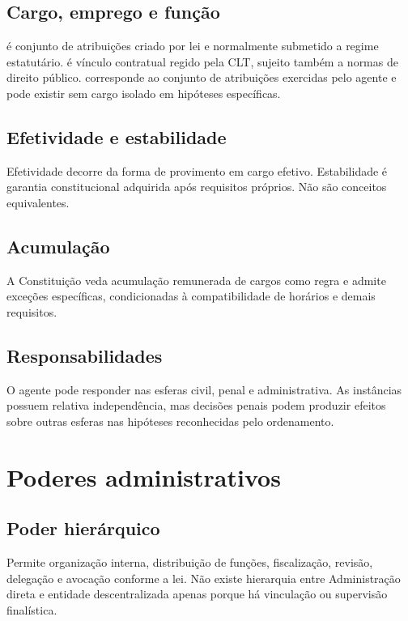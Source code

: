 \subsection{Cargo, emprego e função}

 é conjunto de atribuições criado por lei e normalmente submetido a regime estatutário.  é vínculo contratual regido pela CLT, sujeito também a normas de direito público.  corresponde ao conjunto de atribuições exercidas pelo agente e pode existir sem cargo isolado em hipóteses específicas.

\subsection{Efetividade e estabilidade}

Efetividade decorre da forma de provimento em cargo efetivo. Estabilidade é garantia constitucional adquirida após requisitos próprios. Não são conceitos equivalentes.

\subsection{Acumulação}

A Constituição veda acumulação remunerada de cargos como regra e admite exceções específicas, condicionadas à compatibilidade de horários e demais requisitos.

\subsection{Responsabilidades}

O agente pode responder nas esferas civil, penal e administrativa. As instâncias possuem relativa independência, mas decisões penais podem produzir efeitos sobre outras esferas nas hipóteses reconhecidas pelo ordenamento.

\section{Poderes administrativos}

\subsection{Poder hierárquico}

Permite organização interna, distribuição de funções, fiscalização, revisão, delegação e avocação conforme a lei. Não existe hierarquia entre Administração direta e entidade descentralizada apenas porque há vinculação ou supervisão finalística.

